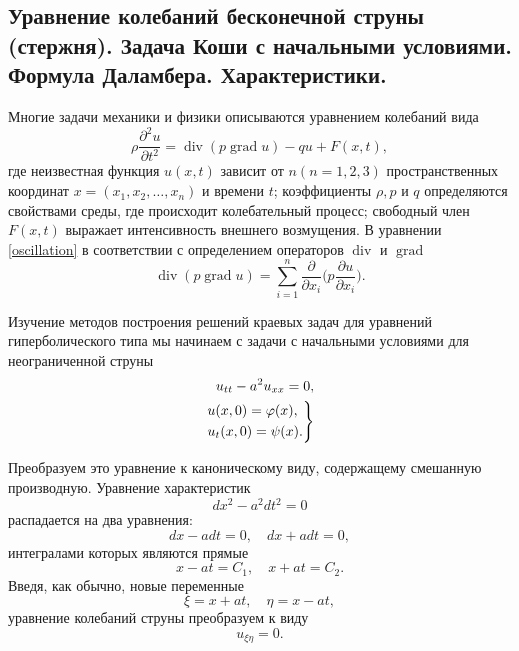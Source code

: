 \subsection{Уравнение колебаний бесконечной струны (стержня). Задача Коши с начальными условиями. Формула Даламбера. Характеристики.}
\label{DalamberFormula}


Многие задачи механики и физики описываются уравнением колебаний вида 
\begin{equation} \label{oscillation}
	\rho \frac{\partial^2 u}{\partial t^2} = \operatorname{div}(p \operatorname{grad}{u}) - q u + F(x, t),
\end{equation}
где неизвестная функция $ u(x, t) $ зависит от $ n (n = 1, 2, 3)$ пространственных координат $x = (x_1, x_2, \dotsc, x_n)$ и времени $t$; коэффициенты $\rho, p$ и $q$ определяются свойствами среды, где происходит колебательный процесс; свободный член $F(x, t)$ выражает интенсивность внешнего возмущения. В уравнении \eqref{oscillation} в соответствии с определением операторов $\operatorname{div}$ и $\operatorname{grad}$
\begin{equation*}
	\operatorname{div}(p\operatorname{grad} u) = \sum \limits_{i = 1}^{n} \frac{\partial}{\partial x_i} \Big(p \frac{\partial u}{\partial x_i}\Big).
\end{equation*}

Изучение методов построения решений краевых задач для уравнений гиперболического типа мы начинаем с задачи с начальными условиями для неограниченной струны 
\begin{align}
	u_{tt} - a^2 u_{xx} = 0, \label{infinite_string} \\
	\begin{rcases}
		u(x, 0) = \varphi(x), \\
		u_t(x, 0) = \psi(x).
	\end{rcases} \label{inf_str_cond}
\end{align}

Преобразуем это уравнение к каноническому виду, содержащему смешанную производную. Уравнение характеристик 
\begin{equation*}
	d x^2 - a^2 d t^2 = 0 
\end{equation*}
распадается на два уравнения:
\begin{equation*}
	d x - a dt = 0, \quad d x + a dt = 0,
\end{equation*}
интегралами которых являются прямые 
\begin{equation*}
	x - a t = C_1, \quad x + a t = C_2.
\end{equation*}
Введя, как обычно, новые переменные
\begin{equation}
	\xi = x + a t, \quad \eta = x - a t,
\end{equation}
уравнение колебаний струны преобразуем к виду
\begin{equation} \label{homo_oscil}
	u_{\xi \eta} = 0.
\end{equation}

